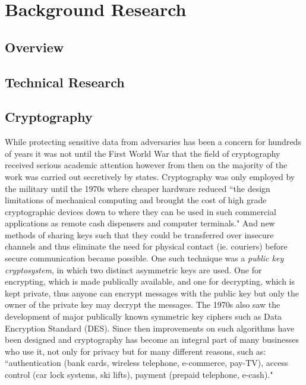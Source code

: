 \documentclass[12pt, titlepage]{article}
\begin{document}
\section{Background Research}
\subsection{Overview}

\subsection{Technical Research}
\subsection*{Cryptography}
While protecting sensitive data from adversaries has been a concern for hundreds of years it was not until the First World War that the field of cryptography received serious academic attention however from then on the majority of the work was carried out secretively by states.\cite{appliedCryptoBook} Cryptography was only employed by the military until the 1970s where cheaper hardware reduced ``the design limitations of mechanical computing and brought the cost of high grade cryptographic devices down to where they can be used in such commercial applications as remote cash dispensers and computer terminals."\cite{newCryptoDirections} And new methods of sharing keys such that they could be transferred over insecure channels and thus eliminate the need for physical contact (ie. couriers) before secure communication became possible. One such technique was a \textit{public key cryptosystem}, in which two distinct asymmetric keys are used. One for encrypting, which is made publically available, and one for decrypting, which is kept private, thus anyone can encrypt messages with the public key but only the owner of the private key may decrypt the messages. The 1970s also saw the development of major publically known symmetric key ciphers such as Data Encryption Standard (DES). Since then improvements on such algorithms have been designed and cryptography has become an integral part of many businesses who use it, not only for privacy but for many different reasons, such as: ``authentication (bank cards, wireless telephone, e-commerce, pay-TV), access control (car lock systems, ski lifts), payment (prepaid telephone, e-cash)."\cite{classicalCryptoBook}
\end{document}
